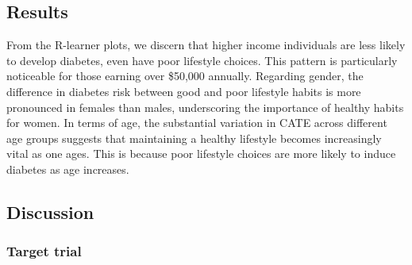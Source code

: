\documentclass[
  12pt,
]{article}
\begin{document}
\hypertarget{results}{%
\subsection{Results}\label{results}}

From the R-learner plots, we discern that higher income individuals are
less likely to develop diabetes, even have poor lifestyle choices. This
pattern is particularly noticeable for those earning over \$50,000
annually. Regarding gender, the difference in diabetes risk between good
and poor lifestyle habits is more pronounced in females than males,
underscoring the importance of healthy habits for women. In terms of
age, the substantial variation in CATE across different age groups
suggests that maintaining a healthy lifestyle becomes increasingly vital
as one ages. This is because poor lifestyle choices are more likely to
induce diabetes as age increases.

\hypertarget{discussion}{%
\subsection{Discussion}\label{discussion}}

\hypertarget{target-trial}{%
\subsubsection{Target trial}\label{target-trial}}
\end{document}
